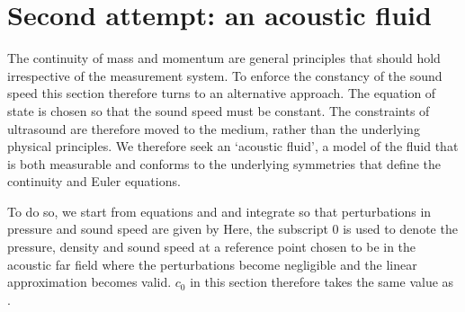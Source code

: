 %
%

\section{Second attempt: an acoustic fluid}\label{sec:incompressibleFluid}

The continuity of mass and momentum are general principles that should hold irrespective of the measurement system.
To enforce the constancy of the sound speed this section therefore turns to an alternative approach.
The equation of state is chosen so that the sound speed must be constant.
The constraints of ultrasound are therefore moved to the medium, rather than the underlying physical principles.
We therefore seek an `acoustic fluid',
a model of the fluid that is both measurable and conforms to the underlying symmetries that define the continuity and Euler equations.




To do so, we start from equations  and 
and integrate so that perturbations in pressure and sound speed are given by
Here, the subscript $0$ is used to denote the pressure, density and sound speed at a reference point
chosen to be in the acoustic far field where the perturbations become negligible and the linear approximation becomes valid.
$c_0$ in this section therefore takes the same value as .

